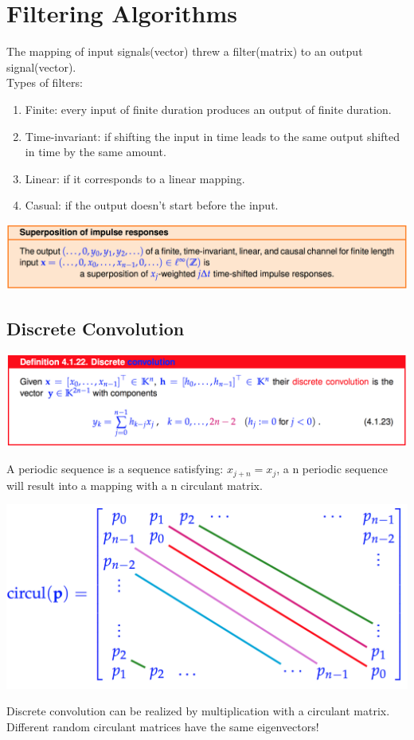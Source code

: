 \documentclass[12pt, a4paper]{article}
\begin{document}
\section{Filtering Algorithms}
The mapping of input signals(vector) threw a filter(matrix) to an output signal(vector).
\\Types of filters:
\begin{enumerate}
	\item Finite: every input of finite duration produces an output of finite duration.
	\item Time-invariant: if shifting the input in time leads to the same output shifted in time by the same amount.
	\item Linear: if it corresponds to a linear mapping.
	\item Casual: if the output doesn't start before the input.
\end{enumerate}
\begin{center}
	\includegraphics[width=380pt]{superposOfImpulseResp.png}
\end{center}
\subsection{Discrete Convolution}
\begin{center}
	\includegraphics[width=380pt]{DescreteConvolution.png}
\end{center}
A periodic sequence is a sequence satisfying: $x_{j+n} = x_j$, a n periodic sequence will result into a mapping with a n circulant matrix.
\begin{center}
	\includegraphics[width=380pt]{circulantMatrix.png}
\end{center}
Discrete convolution can be realized by multiplication with a circulant matrix.\\
Different random circulant matrices have the same eigenvectors!
\end{document}
